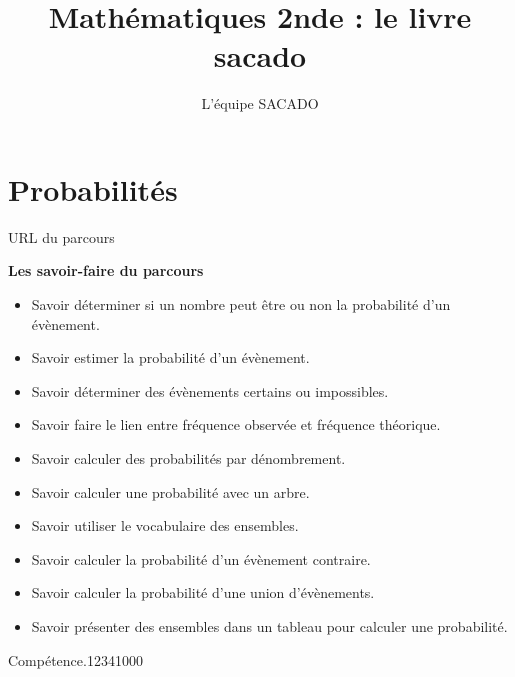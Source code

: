 



\title{Mathématiques 2nde  : le livre sacado}
\author{L'équipe SACADO}




\chapter{Probabilités}
{URL du parcours}
{
 \begin{CpsCol}
	\textbf{Les savoir-faire du parcours}
 	\begin{itemize}
 		\item Savoir déterminer si un nombre peut être ou non la probabilité d'un évènement. 
		\item Savoir estimer la probabilité d'un évènement. 
		\item Savoir déterminer des évènements certains ou impossibles. 
		\item Savoir faire le lien entre fréquence observée et fréquence théorique. 
		\item Savoir calculer des probabilités par dénombrement. 
		\item Savoir calculer une probabilité avec un arbre.  
		\item Savoir utiliser le vocabulaire des ensembles.
		\item Savoir calculer la probabilité d'un évènement contraire.
		\item Savoir calculer la probabilité d'une union d'évènements.
		\item Savoir présenter des ensembles dans un tableau pour calculer une probabilité.
 	\end{itemize}
 \end{CpsCol}

\begin{His}
\end{His}

\begin{ExoDec}{Compétence.}{1234}{1}{0}{0}{0}
\end{ExoDec}
}


